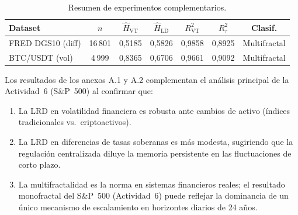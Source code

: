 \begin{table}[H]
\centering
\caption{Resumen de experimentos complementarios.}
\begin{tabular}{lcccccc}
\toprule
\textbf{Dataset} & $n$ & $\hat{H}_{\text{VT}}$ & $\hat{H}_{\text{LD}}$ & $R^2_{\text{VT}}$ & $R^2_{\tau}$ & \textbf{Clasif.} \\
\midrule
FRED DGS10 (diff)  & 16\,801 & 0{,}5185 & 0{,}5826 & 0{,}9858 & 0{,}8925 & Multifractal \\
BTC/USDT (vol)     & 4\,999  & 0{,}8365 & 0{,}6706 & 0{,}9661 & 0{,}9092 & Multifractal \\
\bottomrule
\end{tabular}
\end{table}

Los resultados de los anexos A.1 y A.2 complementan el an\'{a}lisis
principal de la Actividad~6 (S\&P~500) al confirmar que:
\begin{enumerate}[leftmargin=2em, nosep]
    \item La LRD en volatilidad financiera es robusta ante cambios de
          activo (\'{i}ndices tradicionales vs.~criptoactivos).
    \item La LRD en diferencias de tasas soberanas es m\'{a}s modesta,
          sugiriendo que la regulaci\'{o}n centralizada diluye la memoria
          persistente en las fluctuaciones de corto plazo.
    \item La multifractalidad es la norma en sistemas financieros reales;
          el resultado monofractal del S\&P~500 (Actividad~6) puede
          reflejar la dominancia de un \'{u}nico mecanismo de escalamiento
          en horizontes diarios de 24 a\~{n}os.
\end{enumerate}
